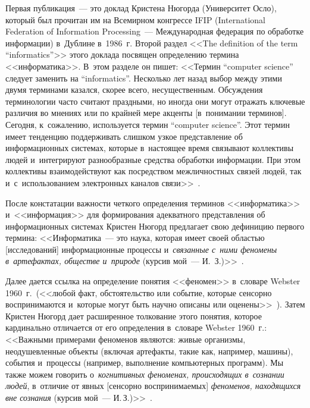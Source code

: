 \begin{multicols}{2}
  Первая публикация~--- это доклад Кристена Нюгорда (Университет Осло), 
который был прочитан им на Всемирном конгрессе IFIP (International 
Federation of Information Processing~--- Международная федерация по 
обработке информации) в~Дублине в~1986~г. Второй раздел <<The definition 
of the term ``informatics''>> этого доклада посвящен определению термина 
<<информатика>>. В~этом разделе он пишет:
  <<Термин ``computer science'' следует заменить на ``informatics''. Несколько 
лет назад выбор между этими двумя терминами казался, скорее всего, 
несущественным. Обсуждения терминологии часто считают праздными, но 
иногда они могут отражать ключевые различия во мнениях или по крайней 
мере акценты [в~понимании терминов]. Сегодня, к~сожалению, используется 
термин ``computer science''. Этот термин имеет тенденцию поддерживать 
слишком узкое представление об информационных системах, которые 
в~настоящее время связывают коллективы людей и~интегрируют 
разнообразные средства обработки информации. При этом коллективы 
взаимодействуют как посредством межличностных связей людей, так 
и~с~использованием электронных каналов связи>>~\cite{8-zac}.
  
  После констатации важности четкого определения терминов 
<<информатика>> и~<<информация>> для формирования адекватного 
представления об информационных системах Кристен Нюгорд предлагает 
свою дефиницию первого термина:
  <<Информатика~--- это наука, которая имеет своей областью 
[исследований] информационные процессы и~\textit{связанные с~ними 
феномены в~артефактах, обществе и~природе} (курсив мой~--- 
И.~З.)>>~\cite{8-zac}.
  
  Далее дается ссылка на определение понятия <<феномен>> в~словаре 
Webster 1960~г.\ (<<любой факт, обстоятельство или событие, которые 
сенсорно воспринимаются и~которые могут быть научно описаны или 
оценены>>~\cite{11-zac}). Затем Кристен Нюгорд дает расширенное 
толкование этого понятия, которое кардинально отличается от его 
определения в~словаре Webster 1960~г.:
  <<Важными примерами феноменов являются: живые организмы, 
неоду\-шев\-лен\-ные объекты (включая артефакты, такие как, например, 
машины), события и~процессы (например, выполнение компьютерных 
программ). Мы также можем говорить о~\textit{когнитивных феноменах, 
происходящих в~сознании людей}, в~отличие от явных [сенсорно 
воспринимаемых] \textit{феноменов, находящихся вне сознания} (курсив 
мой~---  И.\,З.)>>~\cite{8-zac}.
  

\end{multicols}
